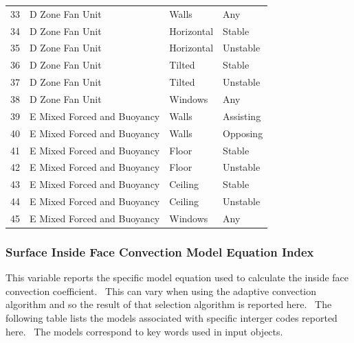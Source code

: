 \begin{longtable}[c]{p{1.5in}p{1.5in}p{1.5in}p{1.5in}}
33 & D Zone Fan Unit & Walls & Any \tabularnewline
34 & D Zone Fan Unit & Horizontal & Stable \tabularnewline
35 & D Zone Fan Unit & Horizontal & Unstable \tabularnewline
36 & D Zone Fan Unit & Tilted & Stable \tabularnewline
37 & D Zone Fan Unit & Tilted & Unstable \tabularnewline
38 & D Zone Fan Unit & Windows & Any \tabularnewline
39 & E Mixed Forced and Buoyancy & Walls & Assisting \tabularnewline
40 & E Mixed Forced and Buoyancy & Walls & Opposing \tabularnewline
41 & E Mixed Forced and Buoyancy & Floor & Stable \tabularnewline
42 & E Mixed Forced and Buoyancy & Floor & Unstable \tabularnewline
43 & E Mixed Forced and Buoyancy & Ceiling & Stable \tabularnewline
44 & E Mixed Forced and Buoyancy & Ceiling & Unstable \tabularnewline
45 & E Mixed Forced and Buoyancy & Windows & Any \tabularnewline
\bottomrule
\end{longtable}

\subsubsection{Surface Inside Face Convection Model Equation Index}\label{surface-inside-face-convection-model-equation-index}

This variable reports the specific model equation used to calculate the inside face convection coefficient.~ This can vary when using the adaptive convection algorithm and so the result of that selection algorithm is reported here.~ The following table lists the models associated with specific interger codes reported here.~ The models correspond to key words used in input objects.

